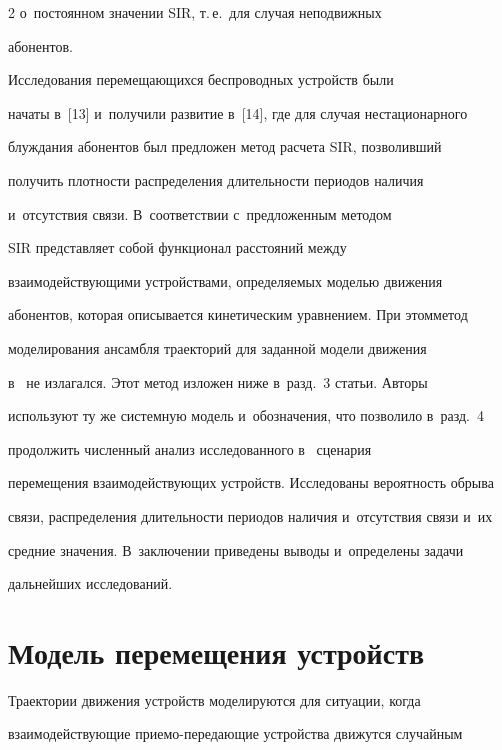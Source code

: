 \begin{multicols}{2}
о~постоянном значении SIR, т.\,е.\ для случая неподвижных 


абонентов. 





Исследования перемещающихся беспроводных устройств были 


начаты в~[13] и~получили развитие в~[14], где для случая нестационарного 


блуж\-да\-ния абонентов был предложен метод расчета SIR, позволивший 


получить плотности распределения длительности периодов наличия 


и~отсутствия связи. В~соответствии с~предложенным методом  


SIR представляет собой функционал расстояний между 


взаимодействующими устройствами, опре\-де\-ля\-емых моделью движения 


абонентов, которая описывается кинетическим уравнением. При этом\linebreak метод 


моделирования ансамбля траекторий для заданной модели движения  


в~\cite{14-g1} не излагался. Этот метод изложен ниже в~разд.~3 статьи. Авторы 


используют ту же системную модель и~обозначения, что позволило в~разд.~4 


продолжить численный анализ исследованного в~\cite{14-g1} сценария 


перемещения взаимодействующих устройств. Исследованы вероятность обрыва 


связи, распределения длительности периодов наличия и~отсутствия связи и~их 


средние значения. В~заключении приведены выводы и~определены задачи 


дальнейших исследований.


  


\section{Модель перемещения устройств}





  Траектории движения устройств моделируются для ситуации, когда 


взаимодействующие при\-емо-пе\-ре\-да\-ющие устройства движутся случайным 



\end{multicols}
